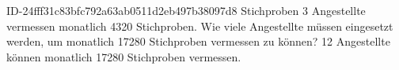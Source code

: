 \begin{exercise}
      {ID-24fff31c83bfc792a63ab0511d2eb497b38097d8}
      {Stichproben}
  \ifproblem\problem
    \num{3} Angestellte vermessen monatlich \num{4320} Stichproben. Wie viele Angestellte
    müssen eingesetzt werden, um monatlich \num{17280} Stichproben vermessen zu können?
  \fi
  \ifoutcome\outcome
    \num{12} Angestellte können monatlich \num{17280} Stichproben vermessen.
  \fi
\end{exercise}
